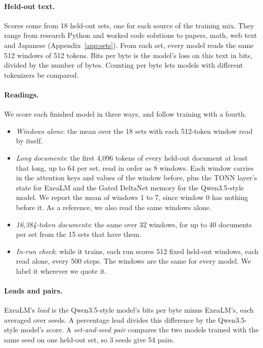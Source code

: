 \documentclass[10pt,twocolumn,letterpaper]{article}
\begin{document}
\paragraph{Held-out text.}
Scores come from 18 held-out sets, one for each source of the training mix.
They range from research Python and worked code solutions to papers, math, web text and Japanese (Appendix~\ref{app:sets}).
From each set, every model reads the same 512 windows of 512 tokens.
Bits per byte is the model's loss on this text in bits, divided by the number of bytes.
Counting per byte lets models with different tokenizers be compared.

\paragraph{Readings.}
We score each finished model in three ways, and follow training with a fourth.
\begin{itemize}
\item \emph{Windows alone}: the mean over the 18 sets with each 512-token window read by itself.
\item \emph{Long documents}: the first 4,096 tokens of every held-out document at least that long, up to 64 per set, read in order as 8 windows. Each window carries in the attention keys and values of the window before, plus the TONN layer's state for ExeaLM and the Gated DeltaNet memory for the Qwen3.5-style model. We report the mean of windows 1 to 7, since window 0 has nothing before it. As a reference, we also read the same windows alone.
\item \emph{16,384-token documents}: the same over 32 windows, for up to 40 documents per set from the 15 sets that have them.
\item \emph{In-run check}: while it trains, each run scores 512 fixed held-out windows, each read alone, every 500 steps. The windows are the same for every model. We label it wherever we quote it.
\end{itemize}

\paragraph{Leads and pairs.}
ExeaLM's \emph{lead} is the Qwen3.5-style model's bits per byte minus ExeaLM's, each averaged over seeds.
A percentage lead divides this difference by the Qwen3.5-style model's score.
A \emph{set-and-seed pair} compares the two models trained with the same seed on one held-out set, so 3 seeds give 54 pairs.
\end{document}
